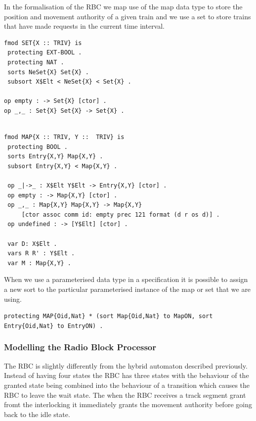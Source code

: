 In the formalisation of the RBC we map use of the map data type to store the position and movement authority of a given train and we use a set to store trains that have made requests in the current time interval. 


\begin{lstlisting}[caption = The specification of the Set data type in Maude]
fmod SET{X :: TRIV} is 
 protecting EXT-BOOL .
 protecting NAT .
 sorts NeSet{X} Set{X} .
 subsort X$Elt < NeSet{X} < Set{X} .

op empty : -> Set{X} [ctor] .
op _,_ : Set{X} Set{X} -> Set{X} .
 

\end{lstlisting}


\begin{lstlisting}[caption = The specification of the Map data type in Maude]
fmod MAP{X :: TRIV, Y ::  TRIV} is
 protecting BOOL .
 sorts Entry{X,Y} Map{X,Y} .
 subsort Entry{X,Y} < Map{X,Y} .

 op _|->_ : X$Elt Y$Elt -> Entry{X,Y} [ctor] .
 op empty : -> Map{X,Y} [ctor] .
 op _,_ : Map{X,Y} Map{X,Y} -> Map{X,Y} 
     [ctor assoc comm id: empty prec 121 format (d r os d)] .
 op undefined : -> [Y$Elt] [ctor] .

 var D: X$Elt .
 vars R R' : Y$Elt .
 var M : Map{X,Y} .
\end{lstlisting}

When we use a parameterised data type in a specification it is possible to assign a new sort to the particular parameterised instance of the map or set that we are using.
\begin{center}
\texttt{protecting MAP\{Oid,Nat\}  * (sort Map\{Oid,Nat\} to MapON,
                               sort Entry\{Oid,Nat\} to EntryON) .}
\end{center}




\subsubsection*{Modelling the Radio Block Processor}
The RBC is slightly differently from the hybrid automaton described previously. Instead of having four states the RBC has three states with the behaviour of the granted state being combined into the behaviour of a transition which causes the RBC to leave the wait state. The when the RBC receives a track segment grant fromt the interlocking it immediately grants the movement authority before going back to the idle state.
 
